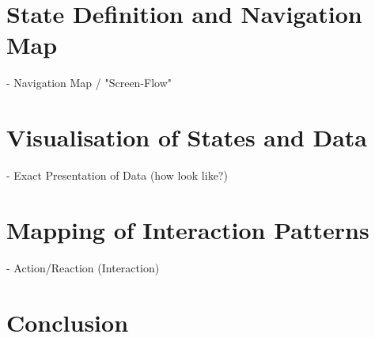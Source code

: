 
\section{State Definition and Navigation Map}


- Navigation Map / "Screen-Flow"



\section{Visualisation of States and Data}

- Exact Presentation of Data (how look like?)



\section{Mapping of Interaction Patterns}

- Action/Reaction (Interaction)





\section{Conclusion}




